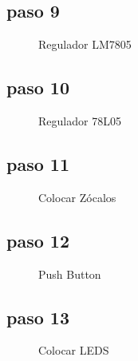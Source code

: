 \documentclass[letterpaper,10pt,english]{sphinxmanual}
\begin{document}
\subsection{paso 9}
\label{np07:paso-9}\begin{figure}[htbp]
\centering
\capstart

\noindent{}
\caption{Regulador LM7805}\label{np07:id15}\end{figure}
\newpage

\subsection{paso 10}
\label{np07:paso-10}\begin{figure}[htbp]
\centering
\capstart

\noindent{}
\caption{Regulador 78L05}\label{np07:id16}\end{figure}
\newpage

\subsection{paso 11}
\label{np07:paso-11}\begin{figure}[htbp]
\centering
\capstart

\noindent{}
\caption{Colocar Zócalos}\label{np07:id17}\end{figure}
\newpage

\subsection{paso 12}
\label{np07:paso-12}\begin{figure}[htbp]
\centering
\capstart

\noindent{}
\caption{Push Button}\label{np07:id18}\end{figure}
\newpage

\subsection{paso 13}
\label{np07:paso-13}\begin{figure}[htbp]
\centering
\capstart

\noindent{}
\caption{Colocar LEDS}\label{np07:id19}\end{figure}
\newpage
\end{document}
